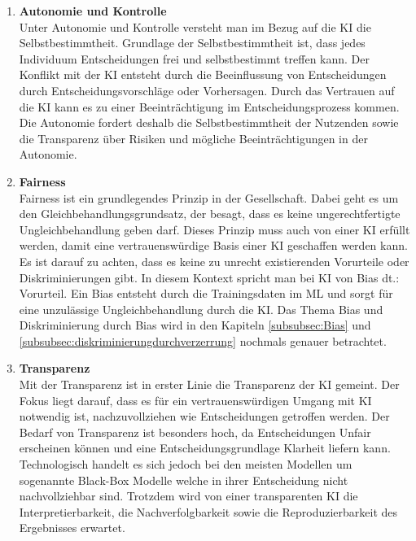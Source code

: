 \begin{onehalfspace}
        \begin{enumerate}
            \item \textbf{Autonomie und Kontrolle} \\
            Unter Autonomie und Kontrolle versteht man im Bezug auf die \ac*{KI} die Selbstbestimmtheit. Grundlage der Selbstbestimmtheit ist, dass jedes Individuum Entscheidungen frei und selbstbestimmt treffen kann. Der Konflikt mit der \ac*{KI} entsteht durch die Beeinflussung von Entscheidungen durch Entscheidungsvorschläge oder Vorhersagen. Durch das Vertrauen auf die \ac*{KI} kann es zu einer Beeinträchtigung im Entscheidungsprozess kommen. Die Autonomie fordert deshalb die Selbstbestimmtheit der Nutzenden sowie die Transparenz über Risiken und mögliche Beeinträchtigungen in der Autonomie.\cite{Cremers2019}\cite{Heesen2020}
            \item \textbf{Fairness} \\
            Fairness ist ein grundlegendes Prinzip in der Gesellschaft. Dabei geht es um den Gleichbehandlungsgrundsatz, der besagt, dass es keine ungerechtfertigte Ungleichbehandlung geben darf. Dieses Prinzip muss auch von einer \ac*{KI} erfüllt werden, damit eine vertrauenswürdige Basis einer \ac*{KI} geschaffen werden kann. Es ist darauf zu achten, dass es keine zu unrecht existierenden Vorurteile oder Diskriminierungen gibt. In diesem Kontext spricht man bei \ac*{KI} von Bias \glqq{}\ac*{dt}.: Vorurteil\grqq{}. Ein Bias entsteht durch die Trainingsdaten im \ac*{ML} und sorgt für eine unzulässige Ungleichbehandlung durch die \ac*{KI}. Das Thema Bias und Diskriminierung durch Bias wird in den Kapiteln \ref*{subsubsec:Bias} und \ref*{subsubsec:diskriminierungdurchverzerrung} nochmals genauer betrachtet.\cite{Cremers2019}\cite{hagendorff2021blind}
            \item \textbf{Transparenz} \\
            Mit der Transparenz ist in erster Linie die Transparenz der \ac*{KI} gemeint. Der Fokus liegt darauf, dass es für ein vertrauenswürdigen Umgang mit \ac*{KI} notwendig ist, nachzuvollziehen wie Entscheidungen getroffen werden. Der Bedarf von Transparenz ist besonders hoch, da Entscheidungen Unfair erscheinen können und eine Entscheidungsgrundlage Klarheit liefern kann. Technologisch handelt es sich jedoch bei den meisten Modellen um sogenannte Black-Box Modelle welche in ihrer Entscheidung nicht nachvollziehbar sind. Trotzdem wird von einer transparenten \ac*{KI} die Interpretierbarkeit, die Nachverfolgbarkeit sowie die Reproduzierbarkeit des Ergebnisses erwartet.\cite{Cremers2019}\cite{Hallensleben2020}\cite{Heesen2020}

\end{enumerate}
\end{onehalfspace}
